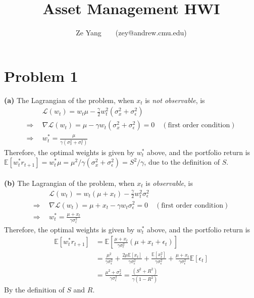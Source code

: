 \documentclass[11pt]{article}
\title{\textbf{Asset Management HWI}}
\author{Ze Yang~~~~(zey@andrew.cmu.edu)}
\begin{document}
    
    
    \maketitle
    
    

\section{Problem 1}\label{problem-1}
 \textbf{(a)} The Lagrangian of the problem, when $x_t$ is \emph{not observable}, is
\begin{equation}
    \begin{split}
        &~~\mathcal{L}(w_t) = w_t \mu - \frac{\gamma}{2} w_t^2(\sigma_x^2 + \sigma_{\epsilon}^2) \\
        \Rightarrow &~~\nabla \mathcal{L}(w_t) = \mu - \gamma w_t(\sigma_x^2 + \sigma_{\epsilon}^2) = 0\quad (\text{first order condition}) \\
        \Rightarrow& ~~w_t^* = \frac{\mu}{\gamma (\sigma_x^2 + \sigma_{\epsilon}^2)}
    \end{split}
\end{equation}
Therefore, the optimal weights is given by $w_t^*$ above, and the portfolio return is $\mathbb{E}\left[ w_t^* r_{t+1}\right] = w_t^*\mu = \mu^2 / \gamma (\sigma_x^2 + \sigma_{\epsilon}^2) = S^2/\gamma$, due to the definition of $S$.\\
~\\
\textbf{(b)} The Lagrangian of the problem, when $x_t$ is \textit{observable}, is
\begin{equation}
    \begin{split}
        &~~\mathcal{L}(w_t) = w_t (\mu + x_t) - \frac{\gamma}{2} w_t^2\sigma_{\epsilon}^2 \\
        \Rightarrow &~~\nabla \mathcal{L}(w_t) = \mu + x_t - \gamma w_t\sigma_{\epsilon}^2 = 0\quad (\text{first order condition}) \\
        \Rightarrow& ~~w_t^* = \frac{\mu+x_t}{\gamma \sigma_{\epsilon}^2}
    \end{split}
\end{equation}
Therefore, the optimal weights is given by $w_t^*$ above, and the portfolio return is 
\begin{equation}
    \begin{split}
        \mathbb{E}\left[ w_t^* r_{t+1}\right] &= \mathbb{E}\left[\frac{\mu+x_t}{\gamma \sigma_{\epsilon}^2}(\mu+x_t + \epsilon_t)\right] \\
        &=\frac{\mu^2}{\gamma \sigma_{\epsilon}^2} + \frac{2\mu \mathbb{E}\left[x_t\right]}{\gamma \sigma_{\epsilon}^2} + \frac{\mathbb{E}\left[x_t^2\right]}{\gamma \sigma_{\epsilon}^2} + \frac{\mu+x_t}{\gamma \sigma_{\epsilon}^2} \mathbb{E}\left[\epsilon_t\right]\\
        &= \frac{\mu^2 + \sigma_x^2}{\gamma \sigma_{\epsilon}^2} = \frac{(S^2 + R^2)}{\gamma(1-R^2)}
    \end{split}
\end{equation}
By the definition of $S$ and $R$.
\\
\end{document}
